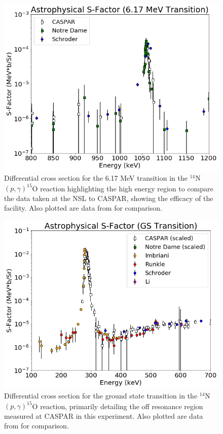 \begin{figure}
		\includegraphics[width=1.0\linewidth]{figures/highCompare617.png}
	\caption{Differential cross section for the 6.17 MeV transition in the $^{14}$N$\left( p,\gamma \right) ^{15}$O reaction highlighting the high energy region to compare the data taken at the NSL to CASPAR, showing the efficacy of the facility. Also plotted are data from \cite{Schroder1987, Li2016} for comparison.  }
	\label{fig: highCompare617}
\end{figure}


\begin{figure}
		\includegraphics[width=1.0\linewidth]{figures/midGS.png}
	\caption{Differential cross section for the ground state transition in the $^{14}$N$\left( p,\gamma \right) ^{15}$O reaction, primarily detailing the off resonance region measured at CASPAR in this experiment. Also plotted are data from \cite{Schroder1987, Imbriani2005, Runkle2005, Li2016} for comparison.  }
	\label{fig: midGS}
\end{figure}


